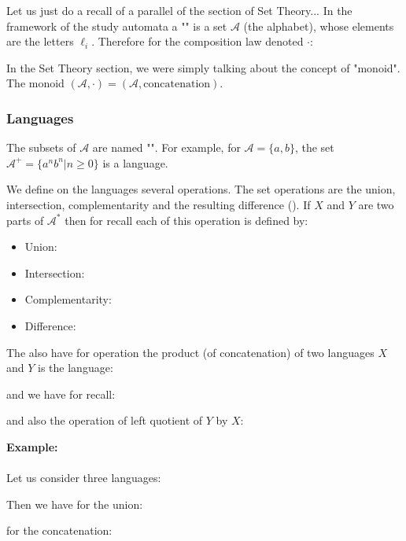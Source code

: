 	Let us just do a recall of a parallel of the section of Set Theory... In the framework of the study automata a "" is a set $\mathcal{A}$ (the alphabet), whose elements are the letters $\ell_i$. Therefore for the composition law denoted $\cdot$:
	
	In the Set Theory section, we were simply talking about the concept of "monoid". The monoid $(\mathcal{A},\cdot)=(\mathcal{A},\text{concatenation})$.
	
	\pagebreak
	\subsubsection{Languages}
	The subsets of $\mathcal{A}$ are named "". For example, for $\mathcal{A}=\{a,b\}$, the set $\mathcal{A}^{+}=\{a^nb^n|n\ge 0\}$ is a language.

	We define on the languages several operations. The set operations are the union, intersection, complementarity and the resulting difference (). If $X$ and $Y$ are two parts of $\mathcal{A}^{*}$ then for recall each of this operation is defined by:
	\begin{itemize}
		\item Union:
		

		\item Intersection:
		

		\item Complementarity:
		

		\item Difference:
		
	\end{itemize}
	The also have for operation the product (of concatenation) of two languages $X$ and $Y$ is the language:
	
	and we have for recall:
	
	and also the operation of left quotient of $Y$ by $X$:
	
	\begin{tcolorbox}[colframe=black,colback=white,sharp corners]
	\textbf{{\Large {}}Example:}\\\\
	Let us consider three languages:
	
	Then we have for the union:
	
	for the concatenation:
	
	\end{tcolorbox}
	
